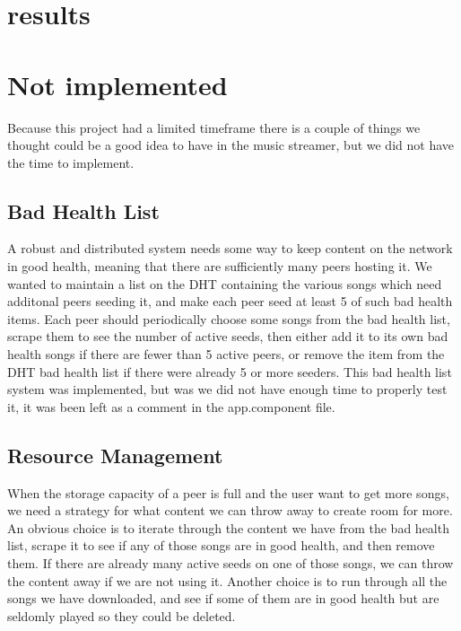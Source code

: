 
\section{results}

\section{Not implemented}
Because this project had a limited timeframe there is a couple of things
we thought could be a good idea to have in the
music streamer, but we did not have the time to implement.

\subsection{Bad Health List}
A robust and distributed system needs some way to keep content on the network in good health,
meaning that there are sufficiently many peers hosting it.
We wanted to maintain a list on the DHT containing the various songs which need additonal peers seeding it,
and make each peer seed at least 5 of such bad health items.
Each peer should periodically choose some songs from the bad health list,
scrape them to see the number of active seeds, 
then either add it to its own bad health songs if there are fewer than 5 active peers,
or remove the item from the DHT bad health list if there were already 5 or more seeders.
This bad health list system was implemented, but was we did not have enough time to properly test it,
it was been left as a comment in the app.component file.

\subsection{Resource Management}
When the storage capacity of a peer is full and the user want to get more songs,
we need a strategy for what content we can throw away to create room for more.
An obvious choice is to iterate through the content we have from the bad health list,
scrape it to see if any of those songs are in good health,
and then remove them.
If there are already many active seeds on one of those songs,
we can throw the content away if we are not using it.
Another choice is to run through all the songs we have downloaded,
and see if some of them are in good health but are seldomly played so they could be deleted.

